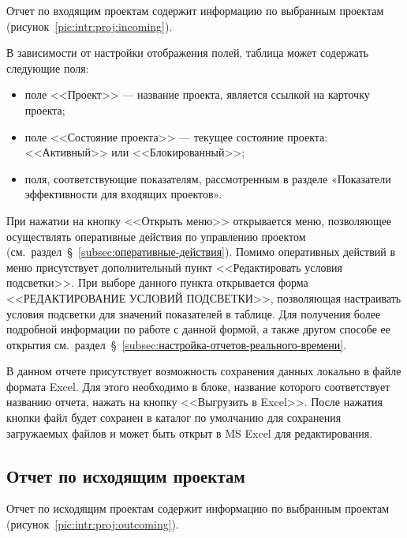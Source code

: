Отчет по входящим проектам содержит информацию по выбранным проектам (рисунок~\ref{pic:intr:proj:incoming}).

В зависимости от настройки отображения полей, таблица может содержать следующие поля:
\begin{itemize}
    \item поле <<Проект>> --- название проекта, является ссылкой на карточку проекта;
    \item поле <<Состояние проекта>> --- текущее состояние проекта: <<Активный>> или <<Блокированный>>;
    \item поля, соответствующие показателям, рассмотренным в разделе «Показатели эффективности для входящих проектов».
\end{itemize}

При нажатии на кнопку <<Открыть меню>> открывается меню, позволяющее осуществлять оперативные действия по управлению проектом
(см.~раздел~\S~\ref{subsec:оперативные-действия}).
Помимо оперативных действий в меню присутствует дополнительный пункт <<Редактировать условия подсветки>>.
При выборе данного пункта открывается форма <<РЕДАКТИРОВАНИЕ УСЛОВИЙ ПОДСВЕТКИ>>,
позволяющая настраивать условия подсветки для значений показателей в таблице.
Для получения более подробной информации по работе с данной формой,
а также другом способе ее открытия см.~раздел~\S~\ref{subsec:настройка-отчетов-реального-времени}.

В данном отчете присутствует возможность сохранения данных локально в файле формата Excel.
Для этого необходимо в блоке, название которого соответствует названию отчета,
нажать на кнопку <<Выгрузить в Excel>>.
После нажатия кнопки файл будет сохранен в каталог по умолчанию для сохранения загружаемых файлов
и может быть открыт в MS Excel для редактирования.

\subsection{Отчет по исходящим проектам}

Отчет по исходящим проектам содержит информацию по выбранным проектам (рисунок~\ref{pic:intr:proj:outcoming}).

